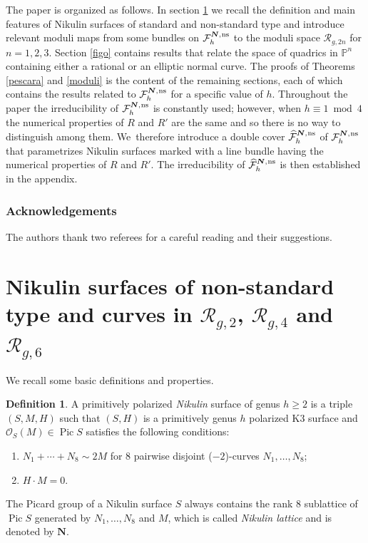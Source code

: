 \documentclass[JEP,XML,SOM,Unicode,NoEqCountersInSection,published]{cedram}
\newcommand{\ns}{{\mkern1mu\mathrm{ns}}}
\newcommand{\bN}{\boldsymbol{N}}
\theoremstyle{plain}
\theoremstyle{definition}
\newtheorem{definition}[thm]{Definition}
\DeclareMathOperator{\Pic}{Pic}
\newcommand\PP{{\mathbb P}}
\newcommand\F{{\mathcal F}}
\renewcommand\O{{\mathcal O}}
\newcommand\R{{\mathcal R}}
\begin{document}
The paper is organized as follows. In section \ref{sec:def} we recall the definition and main features of Nikulin surfaces of standard and non-standard type and introduce relevant moduli maps from some bundles on $\F_h^{\bN,\ns}$ to the moduli space $\R_{g,2n}$ for $n=1,2,3$. Section \ref{figo} contains results that relate the space of quadrics in $\PP^n$ containing either a rational or an elliptic normal curve. The proofs of Theorems \ref{pescara} and \ref{moduli} is the content of the remaining sections, each of which contains the results related to $\F_h^{\bN,\ns}$ for a specific value of $h$. Throughout the paper the irreducibility of $\F_h^{\bN,\ns}$ is constantly used; however, when $h \equiv 1 \bmod 4$ the numerical properties of $R$ and $R'$ are the same and so there is no way to distinguish among them. We~therefore introduce a double cover $\widehat{\F}_h^{\bN,\ns}$ of $\F_h^{\bN,\ns}$ that parametrizes Nikulin surfaces marked with a line bundle having the numerical properties of $R$ and $R'$. The irreducibility of $\widehat{\F}_h^{\bN,\ns}$ is then established in the appendix.

\subsubsection*{Acknowledgements} The authors thank two referees for a careful reading and their suggestions.

\section{Nikulin surfaces of non-standard type and curves in \texorpdfstring{$\R_{g,2}$, $\R_{g,4}$ and $\R_{g,6}$}{R}} \label{sec:def}

We recall some basic definitions and properties.
\begin{definition} \label{def:Nik}
A primitively polarized {\it Nikulin} surface of genus $h \geq 2$ is a triple $(S,M,H)$ such that
$(S,H)$ is a primitively genus $h$ polarized K3 surface and $\O_S(M)\in \Pic S$ satisfies the following conditions:
\begin{enumerate}
\item $ N_1+\cdots+N_8 \sim 2M$ for $8$ pairwise disjoint ($-2$)-curves $N_1,\ldots,N_8$;
\item $H \cdot M=0$.
\end{enumerate}
\end{definition}
The Picard group of a Nikulin surface $S$ always contains the rank $8$ sublattice of $\Pic S$ generated by $N_1,\ldots,N_8$ and $M$, which is called {\it Nikulin lattice} and is denoted by $\bN$.
\end{document}
